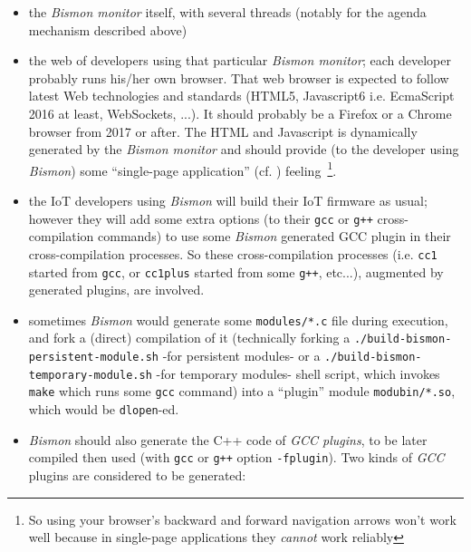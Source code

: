 \begin{itemize}
\item the \emph{Bismon monitor} itself, with several threads (notably for the agenda mechanism described above)
  
  \item the web  of developers using that
    particular \emph{Bismon monitor}; each developer probably runs
    his/her own browser. That web browser is expected to follow latest
    Web technologies and standards (HTML5, Javascript6 i.e. EcmaScript
    2016 at least, WebSockets, ...). It should probably be a Firefox
    or a Chrome browser from 2017 or after. The HTML and Javascript is
    dynamically generated by the \emph{Bismon monitor} and should
    provide (to the developer using \emph{Bismon}) some ``single-page
    application'' (cf. \cite{Atkinson:2018:webtabs,
      Queinnec:2004:ContinWeb, Graunke:2003:ModelingWeb})
    feeling~\footnote{So using your browser's backward and forward
      navigation arrows won't work well because in single-page
      applications they \emph{cannot} work reliably}.

    \item the IoT developers using \emph{Bismon} will build their IoT
      firmware as usual; however they will add some extra options (to
      their \texttt{gcc} or \texttt{g++} cross-compilation commands)
      to use some \emph{Bismon} generated GCC plugin in their
      cross-compilation processes. So these cross-compilation
      processes (i.e. \texttt{cc1} started from \texttt{gcc}, or
      \texttt{cc1plus} started from some \texttt{g++}, etc...),
      augmented by generated plugins, are involved.

  \item sometimes \emph{Bismon} would generate some
    \texttt{modules/*.c} file during execution, and fork a (direct)
    compilation of it (technically forking a
    \texttt{./build-bismon-persistent-module.sh} -for persistent
    modules- or a \texttt{./build-bismon-temporary-module.sh} -for
    temporary modules- shell script, which invokes \texttt{make} which
    runs some \texttt{gcc} command) into a ``plugin'' module
    \texttt{modubin/*.so}, which would be \texttt{dlopen}-ed.

  \item \emph{Bismon} should also generate the C++ code of \emph{GCC
    plugins}, to be later compiled then used (with \texttt{gcc} or
    \texttt{g++} option \texttt{-fplugin}). Two kinds of \emph{GCC}
    plugins are considered to be generated:


\end{itemize}
